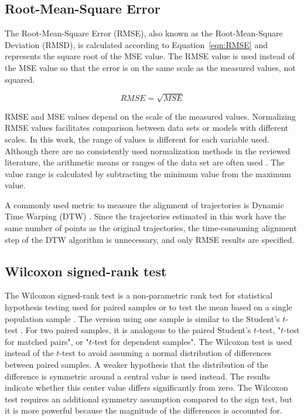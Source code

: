 \documentclass[preprint,12pt]{elsarticle}
\begin{document}
\subsection{Root-Mean-Square Error}

The Root-Mean-Square Error (RMSE), also known as the Root-Mean-Square Deviation (RMSD), is calculated according to Equation~\ref{eqn:RMSE} and represents the square root of the MSE value. The RMSE value is used instead of the MSE value so that the error is on the same scale as the measured values, not squared.

\begin{equation}
   RMSE = \sqrt{MSE} \label{eqn:RMSE}
\end{equation}

RMSE and MSE values depend on the scale of the measured values. Normalizing RMSE values facilitates comparison between data sets or models with different scales. In this work, the range of values is different for each variable used. Although there are no consistently used normalization methods in the reviewed literature, the arithmetic means or ranges of the data set are often used \cite{Booij1999, Ris1999, Zambreskey1988}. The value range is calculated by subtracting the minimum value from the maximum value.

A commonly used metric to measure the alignment of trajectories is Dynamic Time Warping (DTW) \citep{2021Pedroche}. Since the trajectories estimated in this work have the same number of points as the original trajectories, the time-consuming alignment step of the DTW algorithm is unnecessary, and only RMSE results are specified.

\subsection{Wilcoxon signed-rank test}

The Wilcoxon signed-rank test is a non-parametric rank test for statistical hypothesis testing used for paired samples or to test the mean based on a single population sample \cite{conover1999practical}. The version using one sample is similar to the Student's $t$-test \cite{mcdonald2014wilcoxon}. For two paired samples, it is analogous to the paired Student's $t$-test, "$t$-test for matched pairs", or "$t$-test for dependent samples". The Wilcoxon test is used instead of the $t$-test to avoid assuming a normal distribution of differences between paired samples. A weaker hypothesis that the distribution of the difference is symmetric around a central value is used instead. The results indicate whether this center value differs significantly from zero. The Wilcoxon test requires an additional symmetry assumption compared to the sign test, but it is more powerful because the magnitude of the differences is accounted for.
\end{document}
